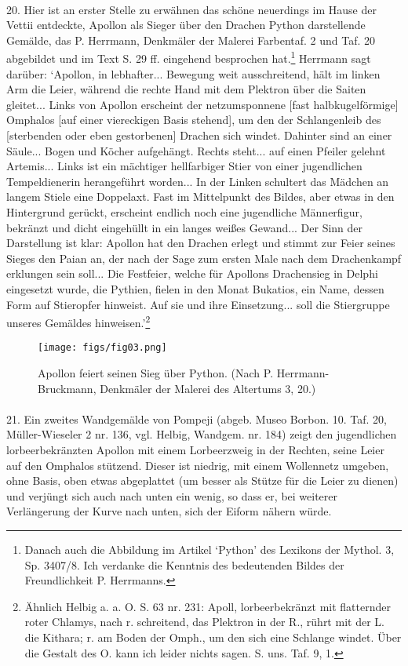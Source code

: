 \documentclass[a4paper, 11pt, oneside]{article}
\begin{document}
\paragraph{}
20. Hier ist an erster Stelle zu erwähnen das schöne neuerdings im Hause der Vettii entdeckte, Apollon als Sieger über den Drachen Python darstellende Gemälde, das P. Herrmann, Denkmäler der Malerei Farbentaf. 2 und Taf. 20 abgebildet und im Text S. 29 ff. eingehend besprochen hat.\footnote{Danach auch die Abbildung im Artikel `Python' des Lexikons der Mythol. 3, Sp. 3407/8. Ich verdanke die Kenntnis des bedeutenden Bildes der Freundlichkeit P. Herrmanns.} Herrmann sagt darüber: `Apollon, in lebhafter... Bewegung weit ausschreitend, hält im linken Arm die Leier, während die rechte Hand mit dem Plektron über die Saiten gleitet... Links von Apollon erscheint der netzumsponnene [fast halbkugelförmige] Omphalos [auf einer viereckigen Basis stehend], um den der Schlangenleib des [sterbenden oder eben gestorbenen] Drachen sich windet. Dahinter sind an einer Säule... Bogen und Köcher aufgehängt. Rechts steht... auf einen Pfeiler gelehnt Artemis... Links ist ein mächtiger hellfarbiger Stier von einer jugendlichen Tempeldienerin herangeführt worden... In der Linken schultert das Mädchen an langem Stiele eine Doppelaxt. Fast im Mittelpunkt des Bildes, aber etwas in den Hintergrund gerückt, erscheint endlich noch eine jugendliche Männerfigur, bekränzt und dicht eingehüllt in ein langes weißes Gewand... Der Sinn der Darstellung ist klar: Apollon hat den Drachen erlegt und stimmt zur Feier seines Sieges den Paian an, der nach der Sage zum ersten Male nach dem Drachenkampf erklungen sein soll... Die Festfeier, welche für Apollons Drachensieg in Delphi eingesetzt wurde, die Pythien, fielen in den Monat Bukatios, ein Name, dessen Form auf Stieropfer hinweist. Auf sie und ihre Einsetzung... soll die Stiergruppe unseres Gemäldes hinweisen.'\footnote{Ähnlich Helbig a. a. O. S. 63 nr. 231: Apoll, lorbeerbekränzt mit flatternder roter Chlamys, nach r. schreitend, das Plektron in der R., rührt mit der L. die Kithara; r. am Boden der Omph., um den sich eine Schlange windet. Über die Gestalt des O. kann ich leider nichts sagen. S. uns. Taf. 9, 1.}

\begin{figure}[H]
\centering
\texttt{[image: figs/fig03.png]}
\caption*{Apollon feiert seinen Sieg über Python. (Nach P. Herrmann-Bruckmann, Denkmäler der Malerei des Altertums 3, 20.)}
\end{figure}
\paragraph{}
21. Ein zweites Wandgemälde von Pompeji (abgeb. Museo Borbon. 10. Taf. 20, Müller-Wieseler 2 nr. 136, vgl. Helbig, Wandgem. nr. 184) zeigt den jugendlichen lorbeerbekränzten Apollon mit einem Lorbeerzweig in der Rechten, seine Leier auf den Omphalos stützend. Dieser ist niedrig, mit einem Wollennetz umgeben, ohne Basis, oben etwas abgeplattet (um besser als Stütze für die Leier zu dienen) und verjüngt sich auch nach unten ein wenig, so dass er, bei weiterer Verlängerung der Kurve nach unten, sich der Eiform nähern würde.
\end{document}
